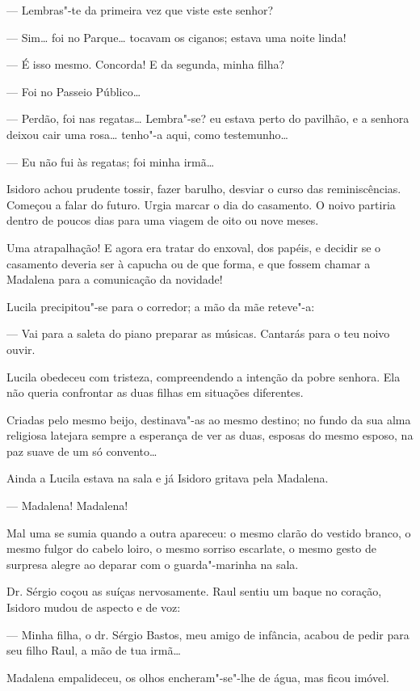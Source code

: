 --- Lembras"-te da primeira vez que viste este senhor?

--- Sim\ldots{} foi no Parque\ldots{} tocavam os ciganos; estava uma noite linda!

--- É isso mesmo. Concorda! E da segunda, minha filha?

--- Foi no Passeio Público\ldots{}

--- Perdão, foi nas regatas\ldots{} Lembra"-se? eu estava perto do pavilhão, e
a senhora deixou cair uma rosa\ldots{} tenho"-a aqui, como testemunho\ldots{}

--- Eu não fui às regatas; foi minha irmã\ldots{}

Isidoro achou prudente tossir, fazer barulho, desviar o curso das
reminiscências. Começou a falar do futuro. Urgia marcar o dia do
casamento. O noivo partiria dentro de poucos dias para uma viagem de
oito ou nove meses.

Uma atrapalhação! E agora era tratar do enxoval, dos papéis, e decidir
se o casamento deveria ser à capucha ou de que forma, e que fossem
chamar a Madalena para a comunicação da novidade!

Lucila precipitou"-se para o corredor; a mão da mãe reteve"-a:

--- Vai para a saleta do piano preparar as músicas. Cantarás para o teu
noivo ouvir.

Lucila obedeceu com tristeza, compreendendo a intenção da pobre senhora.
Ela não queria confrontar as duas filhas em situações diferentes.

Criadas pelo mesmo beijo, destinava"-as ao mesmo destino; no fundo da sua
alma religiosa latejara sempre a esperança de ver as duas, esposas do
mesmo esposo, na paz suave de um só convento\ldots{}

Ainda a Lucila estava na sala e já Isidoro gritava pela Madalena.

--- Madalena! Madalena!

Mal uma se sumia quando a outra apareceu: o mesmo clarão do vestido
branco, o mesmo fulgor do cabelo loiro, o mesmo sorriso escarlate, o
mesmo gesto de surpresa alegre ao deparar com o guarda"-marinha na sala.

Dr. Sérgio coçou as suíças nervosamente. Raul sentiu um baque no
coração, Isidoro mudou de aspecto e de voz:

--- Minha filha, o dr. Sérgio Bastos, meu amigo de infância, acabou de
pedir para seu filho Raul, a mão de tua irmã\ldots{}

Madalena empalideceu, os olhos encheram"-se"-lhe de água, mas ficou
imóvel.

